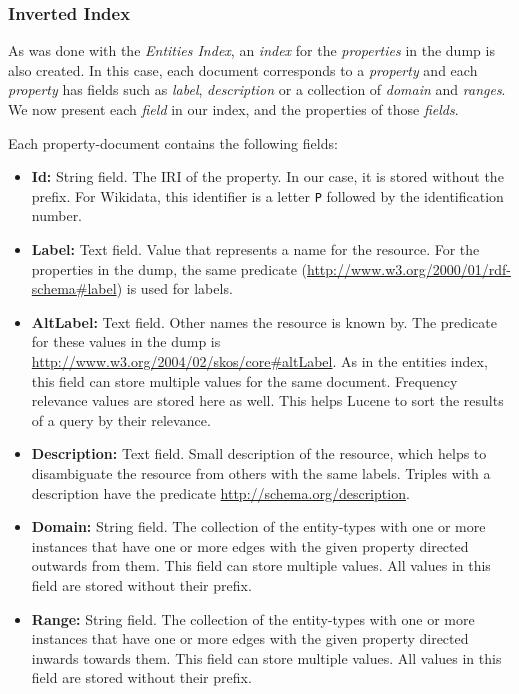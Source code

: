 \subsubsection{Inverted Index}
As  was done with the \textit{Entities Index}, an \textit{index} for the \textit{properties} in the dump is also created. In this case, each document corresponds to a \textit{property} and each \textit{property} has fields such as \textit{label}, \textit{description} or a collection of \textit{domain} and \textit{ranges}. 
We now present each \textit{field} in our index, and the properties of those \textit{fields}.

Each property-document contains the following fields:
\begin{itemize}
    \item \textbf{Id:} String field. The IRI of the property. In our case, it is  stored without the prefix. For Wikidata, this identifier is a letter \texttt{P} followed by the identification number.
    \item \textbf{Label:} Text field.  Value that represents a name for the resource.  For the properties in the dump, the same predicate (\url{http://www.w3.org/2000/01/rdf-schema#label}) is used for labels. 
    \item \textbf{AltLabel:} Text field. Other names the resource is known by. The predicate for these values in the dump is \url{http://www.w3.org/2004/02/skos/core#altLabel}. As in the entities index, this field can store multiple values for the same document. Frequency relevance values are stored here as well. This helps Lucene to sort the results of a query by their relevance.
    \item \textbf{Description:} Text field. Small description of the resource, which helps to disambiguate the resource from others with the same labels. Triples with a description have the predicate \url{http://schema.org/description}.
    \item \textbf{Domain:} String field. The collection of the entity-types with one or more instances that have one or more edges with the given property directed outwards from them. This field can store multiple values. All values in this field are stored without their prefix.
    \item \textbf{Range:} String field. The collection of the entity-types with one or more instances that have one or more edges with the given property directed inwards towards them. This field can store multiple values. All values in this field are stored without their prefix.
\end{itemize}

